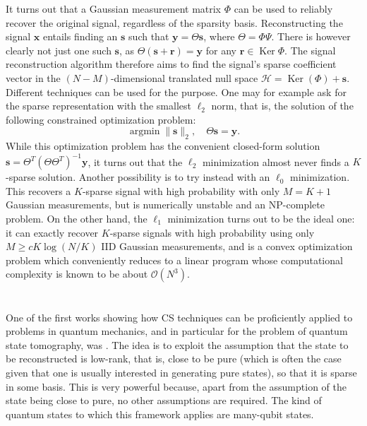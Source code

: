 \documentclass[a4paper, twocolumn]{article}
\newcommand{\bs}[1]{{\boldsymbol{#1}}}
\DeclareMathOperator*{\argmin}{argmin}
\DeclareMathOperator{\Ker}{Ker}
\begin{document}
It turns out that a Gaussian measurement matrix $\Phi$ can be used to reliably recover the original signal, regardless of the sparsity basis.
Reconstructing the signal $\bs x$ entails finding an $\bs s$ such that $\bs y=\Theta\bs s$, where $\Theta=\Phi\Psi$.
There is however clearly not just one such $\bs s$, as $\Theta(\bs s+\bs r) = \bs y$ for any $\bs r\in\Ker\Phi$.
The signal reconstruction algorithm therefore aims to find the signal's sparse coefficient vector in the $(N-M)$-dimensional translated null space $\mathcal H=\Ker(\Phi) + \bs s$.
Different techniques can be used for the purpose.
One may for example ask for the sparse representation with the smallest $\ell_2$ norm,
that is, the solution of the following constrained optimization problem:
\begin{equation}
	\argmin\|\bs s\|_2, \quad \Theta\bs s=\bs y.
\end{equation}
While this optimization problem has the convenient closed-form solution
$\bs s=\Theta^T (\Theta \Theta^T)^{-1} \bs y$,
it turns out that the $\ell_2$ minimization almost never finds a $K$-sparse solution.
Another possibility is to try instead with an $\ell_0$ minimization.
This recovers a $K$-sparse signal with high probability with only $M=K+1$ Gaussian measurements, but is numerically unstable and an NP-complete problem.
On the other hand, the $\ell_1$ minimization turns out to be the ideal one: it can exactly recover $K$-sparse signals with high probability using only
$M \ge c K \log(N/K)$ IID Gaussian measurements,
and is a convex optimization problem which conveniently reduces to a linear program whose computational complexity is known to be about $\mathcal O(N^3)$.

\section{\texorpdfstring{\cite{gross2010quantum}}{Gross et al. (2010)}}
One of the first works showing how CS techniques can be proficiently applied to problems in quantum mechanics, and in particular for the problem of quantum state tomography, was \cite{gross2010quantum}.
The idea is to exploit the assumption that the state to be reconstructed is low-rank, that is, close to be pure (which is often the case given that one is usually interested in generating pure states), so that it is sparse in some basis.
This is very powerful because, apart from the assumption of the state being close to pure, no other assumptions are required.
The kind of quantum states to which this framework applies are many-qubit states.
\end{document}
